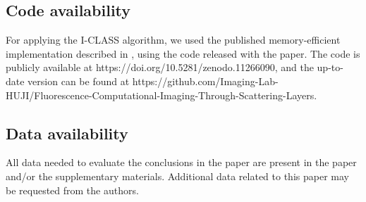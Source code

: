 \documentclass[pdflatex,sn-mathphys-num]{sn-jnl}%
\theoremstyle{thmstyleone}%
\theoremstyle{thmstyletwo}%
\theoremstyle{thmstylethree}%
\begin{document}
\subsection*{Code availability}
For applying the I-CLASS algorithm, we used the published memory-efficient implementation described in \cite{weinberg2023noninvasive,sunray2024beyond}, using the code released with the paper. The code is publicly available at https://doi.org/10.5281/zenodo.11266090, and the up-to-date version can be found at https://github.com/Imaging-Lab-HUJI/Fluorescence-Computational-Imaging-Through-Scattering-Layers.

\subsection*{Data availability}
All data needed to evaluate the conclusions in the paper are present in the paper and/or the supplementary materials. Additional data related to this paper may be requested from the authors.


\end{document}
